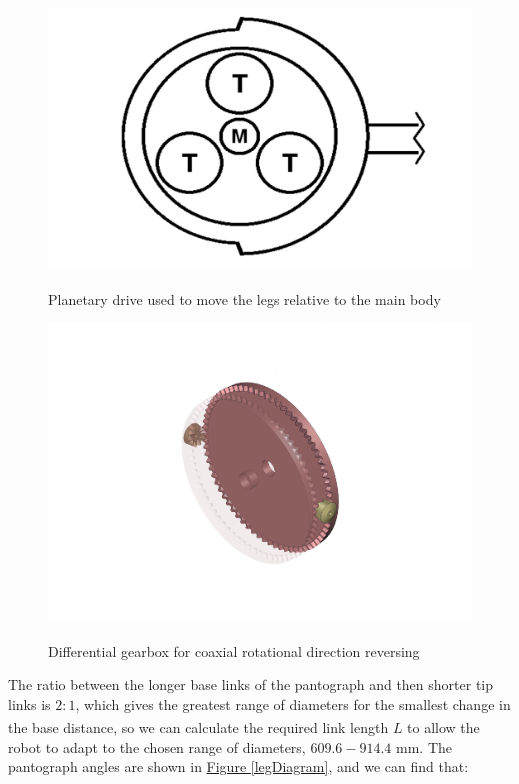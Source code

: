\documentclass[11pt]{article}		%
\newlength{\imageheight}	 %
\begin{document}
			\begin{figure}[h]
				\centering
				\begin{multicols}{2}
					\includegraphics[height=\imageheight]{planetaryDrive}
					\caption{Planetary drive used to move the legs relative to the main body}
					\label{planetaryDrive}
					\columnbreak
					\includegraphics[height=\imageheight]{diffGearbox}
					\caption{Differential gearbox for coaxial rotational direction reversing}
					\label{diffGearbox}
				\end{multicols}
			\end{figure}
			
			The ratio between the longer base links of the pantograph and then shorter tip links is $2:1$, which gives the greatest range of diameters for the smallest change in the base distance\textsuperscript{\cite{okada1987mogrer}}, so we can calculate the required link length $L$ to allow the robot to adapt to the chosen range of diameters, $609.6 - 914.4$ mm.
			The pantograph angles are shown in \hyperref[legDiagram]{Figure \ref*{legDiagram}}, and we can find that:
			
\end{document}

